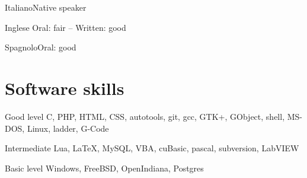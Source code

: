 \documentclass{tccv}
\begin{document}
\begin{minipage}[t]{0.44\linewidth}
\begin{factlist}
\item{Italiano}{Native speaker}
\item{Inglese} {Oral: fair -- Written: good}
\item{Spagnolo}{Oral: good}
\end{factlist}

\section{Software skills}

\begin{factlist}

\item{Good level}
     {C, PHP, HTML, CSS, autotools, git, gcc, GTK+, GObject, shell,
      MS-DOS, Linux, ladder, G-Code}

\item{Intermediate}
     {Lua, \LaTeX, MySQL, VBA, cuBasic, pascal, subversion, LabVIEW}

\item{Basic level}
     {Windows, FreeBSD, OpenIndiana, Postgres}

\end{factlist}

\end{minipage}
\end{document}
